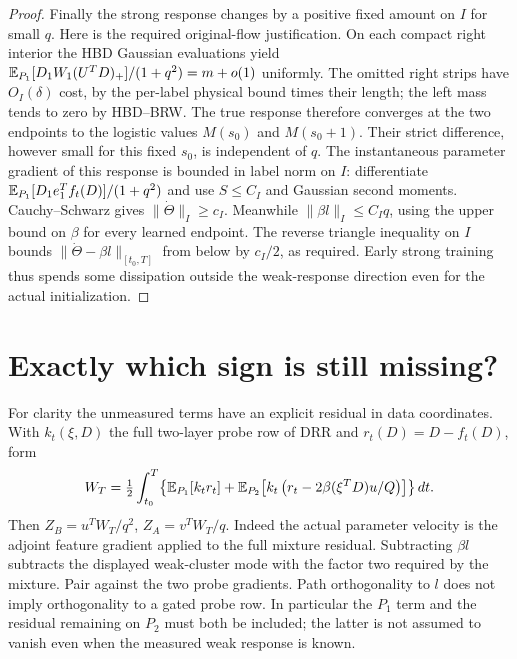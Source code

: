 \documentclass[11pt]{article}
\begin{document}
\begin{proof}
Finally the strong response changes by a positive fixed amount on
$I$ for small $q$. Here is the required original-flow justification.
On each compact right interior the HBD Gaussian evaluations yield
$\mathbb E_{P_1}[D_1 W_1(U^TD)_+]/(1+q^2)=m+o(1)$ uniformly.
The omitted right strips have $O_I(\delta)$ cost, by the per-label
physical bound times their length; the left mass tends to zero by
HBD--BRW. The true response therefore converges at the two
endpoints to the logistic values $M(s_0)$ and $M(s_0+1)$.
Their strict difference, however small for this fixed $s_0$,
is independent of $q$. The instantaneous parameter gradient of
this response is bounded in label norm on $I$: differentiate
$\mathbb E_{P_1}[D_1 e_1^Tf_t(D)]/(1+q^2)$ and use $S\le C_I$ and
Gaussian second moments. Cauchy--Schwarz gives
$\|\dot\Theta\|_{I}\ge c_I$. Meanwhile $\|\beta l\|_I\le C_I q$,
using the upper bound on $\beta$ for every learned endpoint.
The reverse triangle inequality on $I$ bounds
$\|\dot\Theta-\beta l\|_{[t_0,T]}$ from below by $c_I/2$,
as required. Early strong training thus spends some dissipation
outside the weak-response direction even for the actual initialization.
\end{proof}

\section{Exactly which sign is still missing?}
For clarity the unmeasured terms have an explicit residual in data
coordinates. With $k_t(\xi,D)$ the full two-layer probe row of DRR
and $r_t(D)=D-f_t(D)$, form
\begin{equation}\label{an04spmv1:residual}
 W_T=\tfrac12\int_{t_0}^T\!\left\{
  \mathbb E_{P_1}[k_t r_t]+
  \mathbb E_{P_2}\!\left[k_t\left(r_t-2\beta(\xi^TD)u/Q\right)\right]
                         \right\}dt .
\end{equation}
Then $Z_B=u^TW_T/q^2$, $Z_A=v^TW_T/q$.
Indeed the actual parameter velocity is the adjoint feature gradient
applied to the full mixture residual. Subtracting $\beta l$ subtracts
the displayed weak-cluster mode with the factor two required by
the mixture. Pair against the two probe gradients. Path orthogonality
to $l$ does not imply orthogonality to a gated probe row. In
particular the $P_1$ term and the residual remaining on $P_2$ must
both be included; the latter is not assumed to vanish even when
the measured weak response is known.
\end{document}
